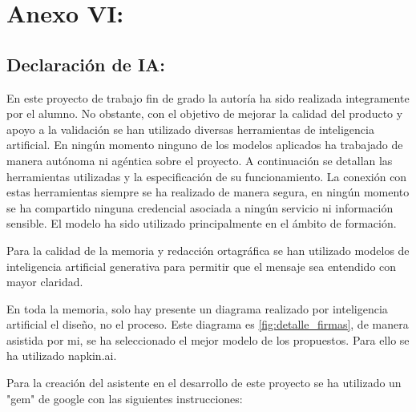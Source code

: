 \section{Anexo VI:}
\subsection{Declaración de IA:}

En este proyecto de trabajo fin de grado la autoría ha sido realizada integramente por el alumno. No obstante, con el objetivo de mejorar la calidad del producto y apoyo a la validación se han utilizado diversas herramientas de inteligencia artificial. En ningún momento ninguno de los modelos aplicados ha trabajado de manera autónoma ni agéntica sobre el proyecto. A continuación se detallan las herramientas utilizadas y la especificación de su funcionamiento. La conexión con estas herramientas siempre se ha realizado de manera segura, en ningún momento se ha compartido ninguna credencial asociada a ningún servicio ni información sensible. El modelo ha sido utilizado principalmente en el ámbito de formación.  

Para la calidad de la memoria y redacción ortagráfica se han utilizado modelos de inteligencia artificial generativa para permitir que el mensaje sea entendido con mayor claridad.

En toda la memoria, solo hay presente un diagrama realizado por inteligencia artificial el diseño, no el proceso. Este diagrama es \ref{fig:detalle_firmas}, de manera asistida por mi, se ha seleccionado el mejor modelo de los propuestos. Para ello se ha utilizado napkin.ai.

Para la creación del asistente en el desarrollo de este proyecto se ha utilizado un "gem" de google con las siguientes instrucciones:

